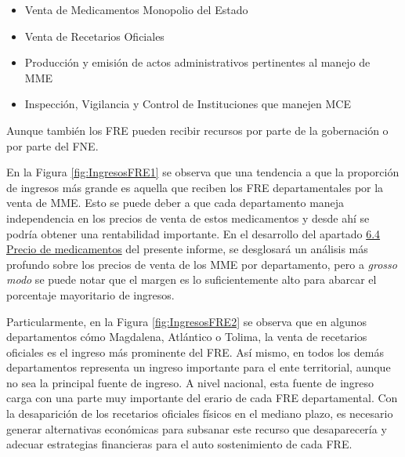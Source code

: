 \documentclass[
]{book}
\begin{document}
\begin{itemize}
\item
  Venta de Medicamentos Monopolio del Estado
\item
  Venta de Recetarios Oficiales
\item
  Producción y emisión de actos administrativos pertinentes al manejo de MME
\item
  Inspección, Vigilancia y Control de Instituciones que manejen MCE
\end{itemize}

Aunque también los FRE pueden recibir recursos por parte de la gobernación o por parte del FNE.

En la Figura \ref{fig:IngresosFRE1} se observa que una tendencia a que la proporción de ingresos más grande es aquella que reciben los FRE departamentales por la venta de MME. Esto se puede deber a que cada departamento maneja independencia en los precios de venta de estos medicamentos y desde ahí se podría obtener una rentabilidad importante. En el desarrollo del apartado \protect\hyperlink{precioMedicamentos}{6.4 Precio de medicamentos} del presente informe, se desglosará un análisis más profundo sobre los precios de venta de los MME por departamento, pero a \emph{grosso modo} se puede notar que el margen es lo suficientemente alto para abarcar el porcentaje mayoritario de ingresos.

Particularmente, en la Figura \ref{fig:IngresosFRE2} se observa que en algunos departamentos cómo Magdalena, Atlántico o Tolima, la venta de recetarios oficiales es el ingreso más prominente del FRE. Así mismo, en todos los demás departamentos representa un ingreso importante para el ente territorial, aunque no sea la principal fuente de ingreso. A nivel nacional, esta fuente de ingreso carga con una parte muy importante del erario de cada FRE departamental. Con la desaparición de los recetarios oficiales físicos en el mediano plazo, es necesario generar alternativas económicas para subsanar este recurso que desaparecería y adecuar estrategias financieras para el auto sostenimiento de cada FRE.
\end{document}
